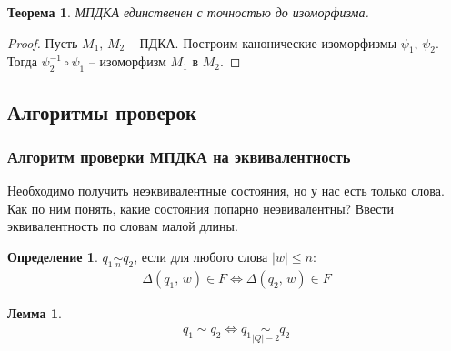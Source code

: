 \documentclass[a4paper,12pt]{article}
\renewcommand{\leq}{\ensuremath{\leqslant}}
\theoremstyle{plain}
\newtheorem{theorem}{Теорема}[subsection]
\newtheorem{lemma}{Лемма}[subsection]
\theoremstyle{definition}
\newtheorem{definition}{Определение}[subsection]
\theoremstyle{remark}
\begin{document}
\begin{theorem}
	МПДКА единственен с точностью до изоморфизма.
\end{theorem}

\begin{proof}
	Пусть $M_1,\, M_2$ -- ПДКА. Построим канонические изоморфизмы $\psi_1,\, \psi_2$. Тогда $\psi_2^{-1} \circ \psi_1$ -- изоморфизм $M_1$ в $M_2$.
\end{proof}

\subsection{Алгоритмы проверок}
\subsubsection*{Алгоритм проверки МПДКА на эквивалентность}
Необходимо получить неэквивалентные состояния, но у нас есть только слова. Как по ним понять, какие состояния попарно неэвивалентны? Ввести эквивалентность по словам малой длины.

\begin{definition}
	$q_1 \underset{n}{\sim} q_2$, если для любого слова $\vert w \vert \leq n$:
	\begin{align*}
		\Delta(q_1,\, w) \in F \Leftrightarrow \Delta(q_2,\, w) \in F
	\end{align*}
\end{definition}

\begin{lemma}
	\begin{align*}
		q_1 \sim q_2 \Leftrightarrow q_1 \underset{\vert Q \vert - 2}{\sim} q_2
	\end{align*}
\end{lemma}
\end{document}
